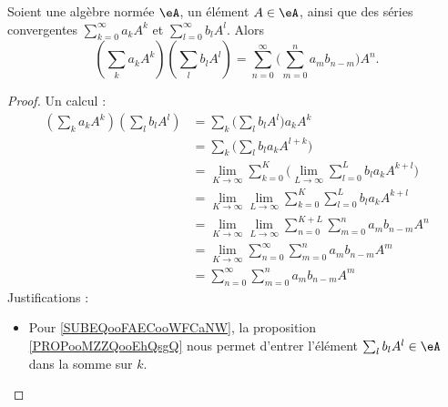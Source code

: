 \begin{proposition}      \label{PROPooFMEXooCNjdhS}
	Soient une algèbre normée \( \eA\), un élément \( A\in \eA\), ainsi que des séries convergentes \( \sum_{k=0}^{\infty}a_kA^k\) et \( \sum_{l=0}^{\infty}b_lA^l\). Alors
	\begin{equation}
		\left( \sum_ka_kA^k \right)\left( \sum_lb_lA^l \right)=\sum_{n=0}^{\infty}\big( \sum_{m=0}^na_mb_{n-m} \big)A^n.
	\end{equation}
\end{proposition}

\begin{proof}
	Un calcul :
	\begin{subequations}
		\begin{align}
			\left( \sum_ka_kA^k \right)\left( \sum_lb_lA^l \right) & =\sum_k\big( \sum_lb_lA^l \big)a_kA^k       \label{SUBEQooFAECooWFCaNW}                                           \\
			                                                       & = \sum_k\big( \sum_lb_la_kA^{l+k} \big)   \label{SUBEQooDZTHooMwmKxJ}                                             \\
			                                                       & = \lim_{K\to\infty} \sum_{k=0}^K\big( \lim_{L\to \infty} \sum_{l=0}^Lb_la_kA^{k+l} \big)                          \\
			                                                       & = \lim_{K\to \infty} \lim_{L\to \infty} \sum_{k=0}^K\sum_{l=0}^Lb_la_kA^{k+l}         \label{SUBEQooISSHooJsyMTv} \\
			                                                       & = \lim_{K\to \infty} \lim_{L\to \infty} \sum_{n=0}^{K+L}\sum_{m=0}^na_mb_{n-m}A^n     \label{SUBEQooAWUQooZCHIXH} \\
			                                                       & = \lim_{K\to \infty} \sum_{n=0}^{\infty}\sum_{m=0}^na_mb_{n-m}A^m                     \label{SUBEQooUVOBooSPGjrA} \\
			                                                       & = \sum_{n=0}^{\infty}\sum_{m=0}^na_mb_{n-m}A^m                                        \label{SUBEQooCGRGooGIDCYv}
		\end{align}
	\end{subequations}
	Justifications :
	\begin{itemize}
		\item Pour \eqref{SUBEQooFAECooWFCaNW}, la proposition \ref{PROPooMZZQooEhQsgQ} nous permet d'entrer l'élément \( \sum_lb_lA^l\in \eA\) dans la somme sur \( k\).

\end{itemize}
\end{proof}
